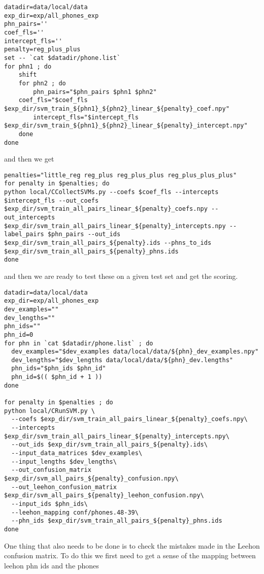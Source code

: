 \documentclass{article}
\begin{document}
\begin{verbatim}
datadir=data/local/data
exp_dir=exp/all_phones_exp
phn_pairs=''
coef_fls=''
intercept_fls=''
penalty=reg_plus_plus
set -- `cat $datadir/phone.list`
for phn1 ; do
    shift
    for phn2 ; do
        phn_pairs="$phn_pairs $phn1 $phn2"
	coef_fls="$coef_fls $exp_dir/svm_train_${phn1}_${phn2}_linear_${penalty}_coef.npy"
        intercept_fls="$intercept_fls $exp_dir/svm_train_${phn1}_${phn2}_linear_${penalty}_intercept.npy"
    done
done
\end{verbatim}
and then we get
\begin{verbatim}
penalties="little_reg reg_plus reg_plus_plus reg_plus_plus_plus"
for penalty in $penalties; do
python local/CCollectSVMs.py --coefs $coef_fls --intercepts $intercept_fls --out_coefs $exp_dir/svm_train_all_pairs_linear_${penalty}_coefs.npy --out_intercepts $exp_dir/svm_train_all_pairs_linear_${penalty}_intercepts.npy --label_pairs $phn_pairs --out_ids $exp_dir/svm_train_all_pairs_${penalty}.ids --phns_to_ids $exp_dir/svm_train_all_pairs_${penalty}_phns.ids
done

\end{verbatim}
and then we are ready to test these on a given test set and get the scoring.
\begin{verbatim}
datadir=data/local/data
exp_dir=exp/all_phones_exp
dev_examples=""
dev_lengths=""
phn_ids=""
phn_id=0
for phn in `cat $datadir/phone.list` ; do
  dev_examples="$dev_examples data/local/data/${phn}_dev_examples.npy"
  dev_lengths="$dev_lengths data/local/data/${phn}_dev.lengths"
  phn_ids="$phn_ids $phn_id"
  phn_id=$(( $phn_id + 1 ))
done

for penalty in $penalties ; do
python local/CRunSVM.py \
  --coefs $exp_dir/svm_train_all_pairs_linear_${penalty}_coefs.npy\
  --intercepts $exp_dir/svm_train_all_pairs_linear_${penalty}_intercepts.npy\
  --out_ids $exp_dir/svm_train_all_pairs_${penalty}.ids\
  --input_data_matrices $dev_examples\
  --input_lengths $dev_lengths\
  --out_confusion_matrix $exp_dir/svm_all_pairs_${penalty}_confusion.npy\
  --out_leehon_confusion_matrix $exp_dir/svm_all_pairs_${penalty}_leehon_confusion.npy\
  --input_ids $phn_ids\
  --leehon_mapping conf/phones.48-39\
  --phn_ids $exp_dir/svm_train_all_pairs_${penalty}_phns.ids
done

\end{verbatim}

One thing that also needs to be done is to check the mistakes
made in the Leehon confusion matrix.  To do this we first
need to get a sense of the mapping between leehon phn ids and
the phones
\end{document}

